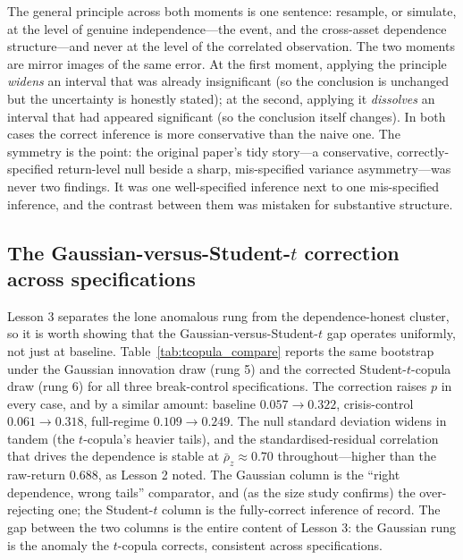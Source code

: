 \documentclass[pdflatex,sn-mathphys-num]{sn-jnl}
\theoremstyle{thmstyleone}
\theoremstyle{thmstyletwo}
\theoremstyle{thmstylethree}
\begin{document}
The general principle across both moments is one sentence: resample, or simulate, at the level of genuine independence---the event, and the cross-asset dependence structure---and never at the level of the correlated observation. The two moments are mirror images of the same error. At the first moment, applying the principle \emph{widens} an interval that was already insignificant (so the conclusion is unchanged but the uncertainty is honestly stated); at the second, applying it \emph{dissolves} an interval that had appeared significant (so the conclusion itself changes). In both cases the correct inference is more conservative than the naive one. The symmetry is the point: the original paper's tidy story---a conservative, correctly-specified return-level null beside a sharp, mis-specified variance asymmetry---was never two findings. It was one well-specified inference next to one mis-specified inference, and the contrast between them was mistaken for substantive structure.

\subsection{The Gaussian-versus-Student-$t$ correction across specifications}\label{sec:gauss_vs_t}

Lesson 3 separates the lone anomalous rung from the dependence-honest cluster, so it is worth showing that the Gaussian-versus-Student-$t$ gap operates uniformly, not just at baseline. Table~\ref{tab:tcopula_compare} reports the same bootstrap under the Gaussian innovation draw (rung 5) and the corrected Student-$t$-copula draw (rung 6) for all three break-control specifications. The correction raises $p$ in every case, and by a similar amount: baseline $0.057\rightarrow 0.322$, crisis-control $0.061\rightarrow 0.318$, full-regime $0.109\rightarrow 0.249$. The null standard deviation widens in tandem (the $t$-copula's heavier tails), and the standardised-residual correlation that drives the dependence is stable at $\bar\rho_z\approx 0.70$ throughout---higher than the raw-return $0.688$, as Lesson 2 noted. The Gaussian column is the ``right dependence, wrong tails'' comparator, and (as the size study confirms) the over-rejecting one; the Student-$t$ column is the fully-correct inference of record. The gap between the two columns is the entire content of Lesson 3: the Gaussian rung is the anomaly the $t$-copula corrects, consistent across specifications.
\end{document}
